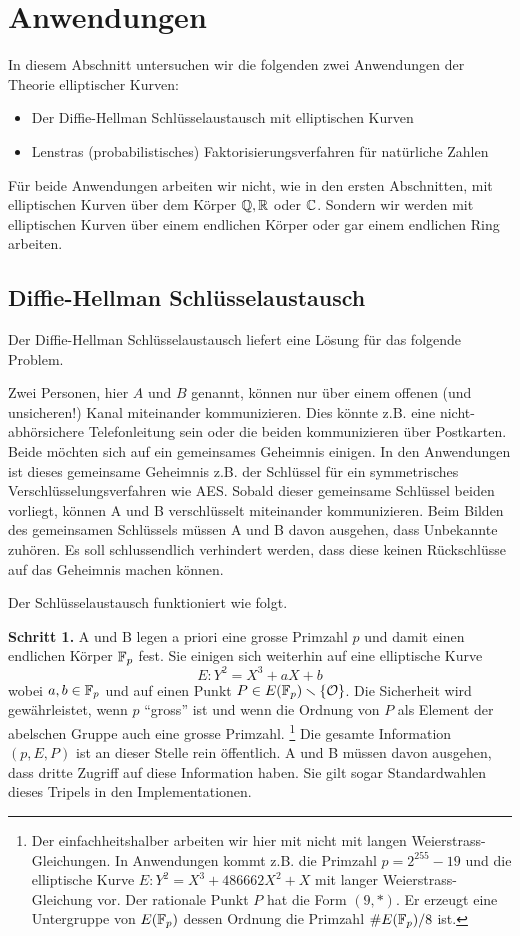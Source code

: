 \chapter{Anwendungen}

In diesem Abschnitt untersuchen wir die folgenden
zwei Anwendungen der Theorie
elliptischer Kurven:

\begin{itemize}
\item Der Diffie-Hellman Schlüsselaustausch mit elliptischen Kurven
\item Lenstras (probabilistisches)
  Faktorisierungsverfahren für natürliche Zahlen
\end{itemize}

Für beide Anwendungen arbeiten wir nicht, wie in den ersten
Abschnitten, mit elliptischen Kurven über dem Körper ${\mathbb{Q}},{\mathbb{R}}$ oder
${\mathbb{C}}$. Sondern wir werden mit elliptischen Kurven über einem endlichen
Körper oder gar einem endlichen Ring arbeiten. 

\section{Diffie-Hellman Schlüsselaustausch}

Der Diffie-Hellman Schlüsselaustausch liefert eine Lösung für das
folgende Problem.

Zwei Personen, hier $A$ und $B$ genannt, können nur über einem offenen
(und unsicheren!)
Kanal miteinander kommunizieren. Dies könnte z.B. eine
nicht-abhörsichere Telefonleitung sein oder die beiden kommunizieren
über Postkarten. Beide möchten sich auf ein gemeinsames Geheimnis
einigen. In den Anwendungen ist dieses gemeinsame Geheimnis z.B. der
Schlüssel für ein symmetrisches Verschlüsselungsverfahren wie 
AES. Sobald dieser gemeinsame Schlüssel beiden vorliegt, können A
und B  verschlüsselt miteinander kommunizieren. Beim
Bilden des gemeinsamen Schlüssels müssen A und B davon ausgehen, dass
Unbekannte zuhören. Es soll schlussendlich verhindert werden, dass
diese keinen Rückschlüsse auf das Geheimnis machen können.

Der Schlüsselaustausch funktioniert wie folgt.

\bigskip
\textbf{Schritt 1.} A und B legen a priori 
eine grosse Primzahl $p$ und damit einen endlichen Körper ${\mathbb{F}}_p$ fest.
Sie einigen sich weiterhin auf eine elliptische Kurve
$$E: Y^2 = X^3+aX+b$$
wobei $a,b\in{\mathbb{F}}_p$ und auf einen Punkt $P\in
E({\mathbb{F}}_p)\smallsetminus\{{\mathcal O}\}$. Die Sicherheit wird gewährleistet, wenn $p$
``gross'' ist und wenn die Ordnung von $P$ als Element der abelschen
Gruppe auch eine grosse  Primzahl.  
\footnote{Der einfachheitshalber arbeiten wir hier
  mit nicht mit langen Weierstrass-Gleichungen. In Anwendungen kommt
  z.B. die Primzahl 
 $p = 2^{255}-19$ und die elliptische Kurve
  $E: Y^2 = X^3+486662X^2+X$ mit langer Weierstrass-Gleichung vor. Der
rationale Punkt $P$ hat die Form $(9,*)$. Er erzeugt eine Untergruppe
von $E({\mathbb{F}}_p)$ dessen Ordnung die Primzahl $\#E({\mathbb{F}}_p)/8$ ist.}
Die gesamte Information $(p,E,P)$ ist an dieser Stelle rein
öffentlich. 
A und B müssen davon ausgehen, dass dritte Zugriff auf
diese Information haben.
Sie gilt sogar Standardwahlen dieses Tripels in den Implementationen.

